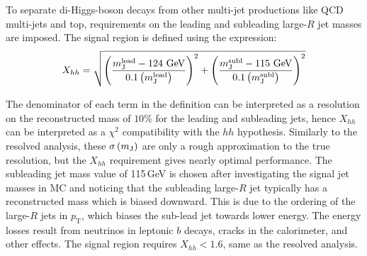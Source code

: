 To separate di-Higgs-boson decays from other multi-jet productions like QCD multi-jets and top, requirements on the leading and subleading large-$R$ jet masses are imposed. The signal region is defined using the expression:
\begin{equation}
\label{eq:boosted_XhhDef}
X_{hh} = \sqrt{\left(\frac{m^{\rm lead}_{\rm J} - \text{124 GeV}}{0.1 \left(m^{\rm lead}_{\rm J}\right)}\right)^2 + \left(\frac{m^{\rm subl}_{\rm J}- \text{115 GeV}}{0.1 \left(m^{\rm subl}_{\rm J}\right)}\right)^2}
\end{equation}

The denominator of each term in the definition can be interpreted as a resolution on the reconstructed mass of $10\%$ for the leading and subleading jets, hence $X_{hh}$ can be interpreted as a $\chi^2$ compatibility with the $hh$ hypothesis. Similarly to the resolved analysis, these $\sigma \left(m_{\rm J}\right)$ are only a rough approximation to the true resolution, but the $X_{hh}$ requirement gives nearly optimal performance. The subleading jet mass value of 115\,GeV  is chosen after investigating the signal jet masses in MC and noticing that the subleading large-$R$ jet typically has a reconstructed mass which is biased downward. This is due to the ordering of the large-$R$ jets in $p_\text{T}$, which biases the sub-lead jet towards lower energy. The energy losses result from neutrinos in leptonic $b$ decays, cracks in the calorimeter, and other effects. The signal region requires $X_{hh} < 1.6$, same as the resolved analysis. 

